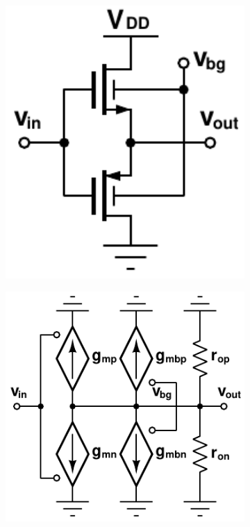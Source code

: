 			\begin{figure}[htb!]
			    \centering
			    \begin{subfigure}{0.33\textwidth}
			        \centering
			        \includegraphics[width=1\textwidth, angle=0]{./figs/design/fig_10a_}
			        \caption{ }
			        \label{fig:fig_10a}
			    \end{subfigure}%
			    \begin{subfigure}{0.33\textwidth}
			        \centering
			        \includegraphics[width=1\textwidth, angle=0]{./figs/design/fig_10b}

\end{subfigure}
\end{figure}
